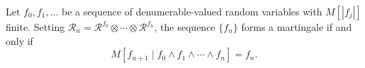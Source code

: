 Let $f_0, f_1, \ldots$ be a sequence of denumerable-valued random variables with $M[|f_j|]$ finite. Setting $\mathcal{R}_n = \mathcal{R}^{f_0} \otimes \cdots \otimes \mathcal{R}^{f_n}$, the sequence $\{f_n\}$ forms a martingale if and only if $$M[f_{n+1} \mid f_0 \wedge f_1 \wedge \cdots \wedge f_n] = f_n.$$